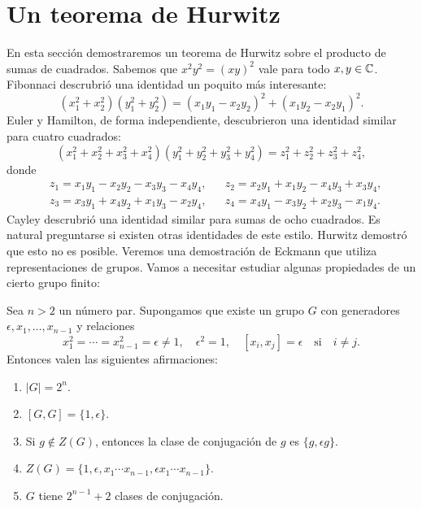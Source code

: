 \chapter{Un teorema de Hurwitz}

En esta sección demostraremos un teorema de Hurwitz sobre el producto de sumas
de cuadrados. Sabemos que $x^2y^2=(xy)^2$ vale para todo $x,y\in\mathbb{C}$. Fibonnaci
descrubrió una identidad un poquito más interesante:
\[
	(x_1^2+x_2^2)(y_1^2+y_2^2)=(x_1y_1-x_2y_2)^2+(x_1y_2-x_2y_1)^2.
\]
Euler y Hamilton, de forma independiente, descubrieron una identidad similar
para cuatro cuadrados:
\[
	(x_1^2+x_2^2+x_3^2+x_4^2)(y_1^2+y_2^2+y_3^2+y_4^2)=z_1^2+z_2^2+z_3^2+z_4^2,
\]
donde
\begin{equation}
\label{eq:Hamilton}
\begin{aligned}
	& z_1=x_1y_1-x_2y_2-x_3y_3-x_4y_4, && 
	z_2=x_2y_1+x_1y_2-x_4y_3+x_3y_4,\\
	&z_3=x_3y_1+x_4y_2+x_1y_3-x_2y_4, && 
	z_4=x_4y_1-x_3y_2+x_2y_3-x_1y_4.
\end{aligned}
\end{equation}
Cayley descrubrió una identidad similar para sumas de ocho cuadrados. Es
natural preguntarse si existen otras identidades de este estilo. Hurwitz
demostró que esto no es posible. Veremos una demostración de Eckmann que
utiliza representaciones de grupos.  Vamos a necesitar estudiar algunas
propiedades de un cierto grupo finito:

\begin{lemma}
	Sea $n>2$ un número par. Supongamos que existe un grupo $G$ con generadores
	$\epsilon,x_1,\dots,x_{n-1}$ y relaciones
	\[
		x_1^2=\cdots=x_{n-1}^2=\epsilon\ne1,\quad
		\epsilon^2=1,\quad
		[x_i,x_j]=\epsilon\quad\text{si}\quad i\ne j.
	\]
	Entonces valen las siguientes afirmaciones:
	\begin{enumerate}
		\item $|G|=2^n$.
		\item $[G,G]=\{1,\epsilon\}$.
		\item Si $g\not\in Z(G)$, entonces la clase de conjugación de $g$ es $\{g,\epsilon g\}$.
		\item $Z(G)=\{1,\epsilon,x_1\cdots x_{n-1},\epsilon x_1\cdots x_{n-1}\}$. 
		\item $G$ tiene $2^{n-1}+2$ clases de conjugación.
	\end{enumerate}
\end{lemma}


